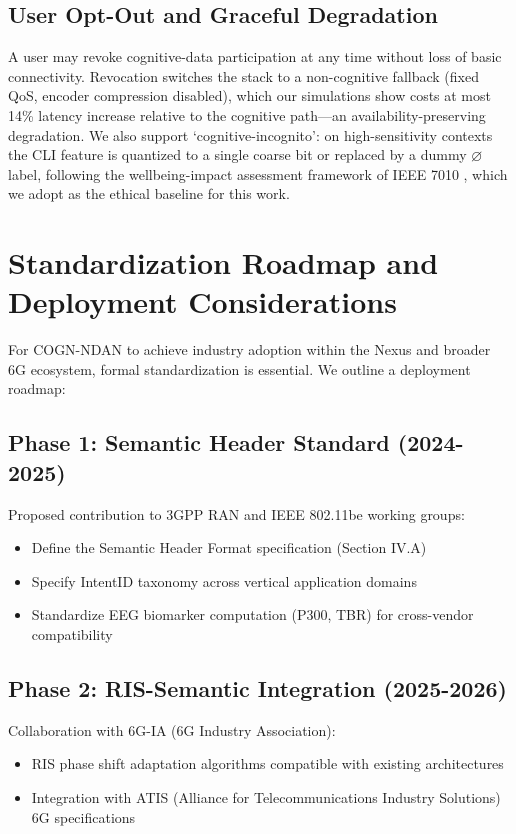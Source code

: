 \documentclass{BVP_CINC}
\newcommand{\COGN}{COGN-NDAN}
\begin{document}
\subsection{User Opt-Out and Graceful Degradation}
A user may revoke cognitive-data participation at any time without loss of basic connectivity. Revocation switches the stack to a non-cognitive fallback (fixed QoS, encoder compression disabled), which our simulations show costs at most 14\% latency increase relative to the cognitive path---an availability-preserving degradation. We also support `cognitive-incognito': on high-sensitivity contexts the CLI feature is quantized to a single coarse bit or replaced by a dummy $\varnothing$ label, following the wellbeing-impact assessment framework of IEEE 7010 \cite{ieee7010}, which we adopt as the ethical baseline for this work.

\section{Standardization Roadmap and Deployment Considerations}

For \COGN{} to achieve industry adoption within the Nexus and broader 6G ecosystem, formal standardization is essential. We outline a deployment roadmap:

\subsection{Phase 1: Semantic Header Standard (2024-2025)}
Proposed contribution to 3GPP RAN and IEEE 802.11be working groups:
\begin{itemize}
    \item Define the Semantic Header Format specification (Section IV.A)
    \item Specify IntentID taxonomy across vertical application domains
    \item Standardize EEG biomarker computation (P300, TBR) for cross-vendor compatibility
\end{itemize}

\subsection{Phase 2: RIS-Semantic Integration (2025-2026)}
Collaboration with 6G-IA (6G Industry Association):
\begin{itemize}
    \item RIS phase shift adaptation algorithms compatible with existing architectures
    \item Integration with ATIS (Alliance for Telecommunications Industry Solutions) 6G specifications
\end{itemize}
\end{document}

